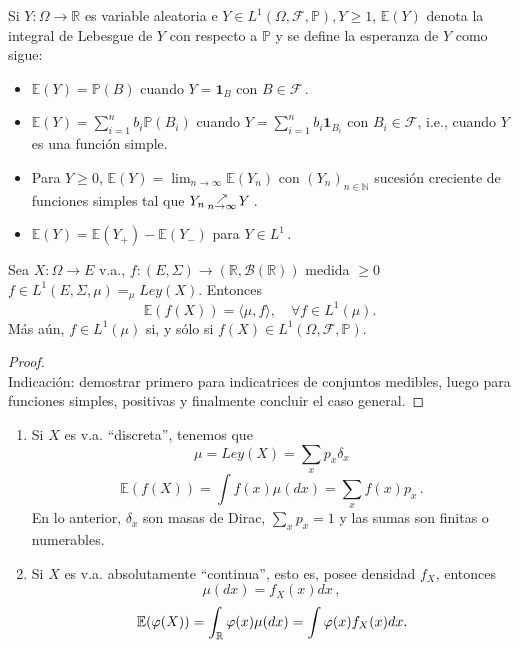 \begin{definition}[Esperanza]
Si $Y:\Omega \longrightarrow \mathbb{R}$ es variable aleatoria e $Y\in L^1(\Omega,\mathcal{F},\mathbb{P}), Y\geq1$, $\mathbb{E}(Y)$ denota la integral de Lebesgue de $Y$ con respecto a $\mathbb{P}$ y se define la esperanza de $Y$ como sigue:

\begin{itemize}
    \item $\mathbb{E}(Y)=\mathbb{P}(B)$ cuando $Y=\mathbf{1}_B$ con $B \in \mathcal{F}$\,.
    \item $\displaystyle\mathbb{E}(Y)=\sum^n_{i=1} b_i \mathbb{P}(B_i)$ cuando $\displaystyle Y=\sum^n_{i=1}b_i\mathbf{1}_{B_i}$ con $B_i \in \mathcal{F}$, i.e., cuando $Y$ es una función simple.
    \item Para $Y\geq0$, $\mathbb{E}(Y) = \displaystyle \lim_{n\rightarrow \infty}\mathbb{E}(Y_n)$ con $(Y_n)_{n \in \mathbb{N}}$ sucesión creciente de funciones simples tal que $Y_n \displaystyle \,\substack{\nearrow \\ \tiny{n\to\infty}}\, Y$\,.
    \item $\mathbb{E}(Y) = \mathbb{E}(Y_+)-\mathbb{E}(Y_-)$ para $Y\in L^1$\,.
\end{itemize}
\end{definition}

\begin{proposition}
Sea $X:\Omega \longrightarrow E $ v.a., $f:(E,\Sigma)\longrightarrow (\mathbb{R},\mathcal{B(\mathbb{R})})$ medida $\geq 0$ $f\in L^1(E,\Sigma,\mu) =_\mu Ley(X)$. Entonces
$$\mathbb{E}(f(X)) = \langle \mu,f \rangle,\quad\forall f \in L^1(\mu).$$
Más aún, $f\in L^1(\mu)$ si, y sólo si $f(X) \in L^1(\Omega,\mathcal{F},\mathbb{P})$.
\end{proposition}
\begin{proof}
\ejercicio
\gris \\
Indicación: demostrar primero para indicatrices de conjuntos medibles, luego para funciones simples, positivas y finalmente concluir el caso general. \negro
\end{proof}

\begin{remark}
\beforeitemize
\begin{enumerate}
    \item Si $X$ es v.a. ``discreta'', tenemos que
    $$ \mu=Ley(X) = \sum_x p_x\delta_x$$
    $$\mathbb{E}(f(X)) = \int f(x)\mu(dx) = \sum_x f(x)p_x \, .$$
    En lo anterior, $\delta_x$ son masas de Dirac, $\sum_xp_x = 1$ y las sumas son finitas o numerables.
    \item Si $X$ es v.a. absolutamente ``continua'', esto es, posee densidad $f_X$, entonces
    $$ \mu(dx) = f_X(x)dx \, ,$$ 
    $$ \mathbb{E}(\varphi(X))=\int_{\mathbb{R}}\varphi(x)\mu(dx)=\int\varphi(x) f_X(x)dx.$$
\end{enumerate}
\end{remark}

